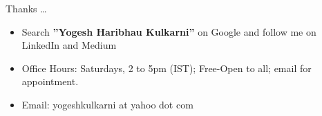 \begin{frame}[c]{}

Thanks \ldots

\begin{itemize}
\item Search {\Large \bf ''Yogesh Haribhau Kulkarni''} on Google and follow me on LinkedIn and Medium
\item Office Hours: Saturdays, 2 to 5pm (IST); Free-Open to all; email for appointment.
\item Email: yogeshkulkarni at yahoo dot com
\end{itemize}
\end{frame}